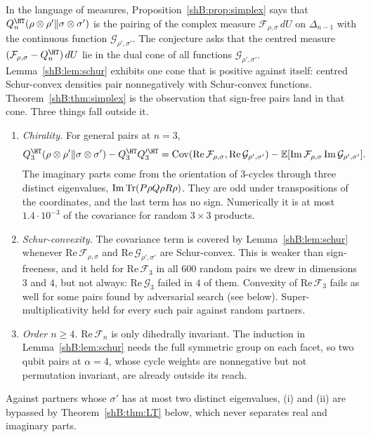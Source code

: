 \begin{remark}\label{shB:rem:simplexopen}
In the language of measures, Proposition~\ref{shB:prop:simplex} says that $Q^\HT_n(\rho\otimes\rho'\|\sigma\otimes\sigma')$ is the pairing of the complex measure $\mathcal F_{\rho,\sigma}\,dU$ on $\Delta_{n-1}$ with the continuous function $\mathcal G_{\rho',\sigma'}$. The conjecture asks that the centred measure $(\mathcal F_{\rho,\sigma}-Q^\HT_n)\,dU$ lie in the dual cone of all functions $\mathcal G_{\rho',\sigma'}$. Lemma~\ref{shB:lem:schur} exhibits one cone that is positive against itself: centred Schur-convex densities pair nonnegatively with Schur-convex functions. Theorem~\ref{shB:thm:simplex} is the observation that sign-free pairs land in that cone. Three things fall outside it.
\begin{enumerate}[label=(\roman*)]
\item \emph{Chirality.} For general pairs at $n=3$,
\[
Q^\HT_3(\rho\otimes\rho'\|\sigma\otimes\sigma')-Q^\HT_3Q'^\HT_3=\mathrm{Cov}(\mathrm{Re}\,\mathcal F_{\rho,\sigma},\mathrm{Re}\,\mathcal G_{\rho',\sigma'})-\mathbb E[\mathrm{Im}\,\mathcal F_{\rho,\sigma}\,\mathrm{Im}\,\mathcal G_{\rho',\sigma'}].
\]
The imaginary parts come from the orientation of $3$-cycles through three distinct eigenvalues, $\mathrm{Im}\operatorname{Tr}(P\rho Q\rho R\rho)$. They are odd under transpositions of the coordinates, and the last term has no sign. Numerically it is at most $1.4\cdot10^{-3}$ of the covariance for random $3\times3$ products.
\item \emph{Schur-convexity.} The covariance term is covered by Lemma~\ref{shB:lem:schur} whenever $\mathrm{Re}\,\mathcal F_{\rho,\sigma}$ and $\mathrm{Re}\,\mathcal G_{\rho',\sigma'}$ are Schur-convex. This is weaker than sign-freeness, and it held for $\mathrm{Re}\,\mathcal F_3$ in all $600$ random pairs we drew in dimensions $3$ and $4$, but not always: $\mathrm{Re}\,\mathcal G_3$ failed in $4$ of them. Convexity of $\mathrm{Re}\,\mathcal F_3$ fails as well for some pairs found by adversarial search (see below). Super-multiplicativity held for every such pair against random partners.
\item \emph{Order $n\ge4$.} $\mathrm{Re}\,\mathcal F_n$ is only dihedrally invariant. The induction in Lemma~\ref{shB:lem:schur} needs the full symmetric group on each facet, so two qubit pairs at $\alpha=4$, whose cycle weights are nonnegative but not permutation invariant, are already outside its reach.
\end{enumerate}
Against partners whose $\sigma'$ has at most two distinct eigenvalues, (i) and (ii) are bypassed by Theorem~\ref{shB:thm:LT} below, which never separates real and imaginary parts.


\end{remark}
